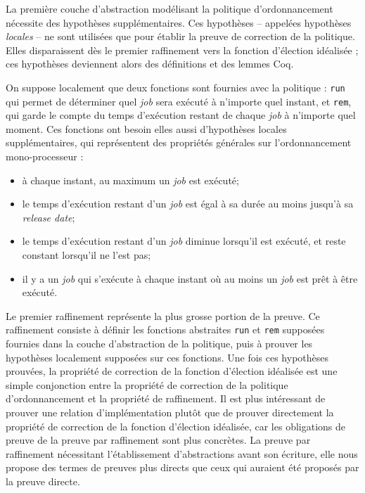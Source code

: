 	La première couche d'abstraction modélisant la politique d'ordonnancement nécessite des hypothèses supplémentaires. Ces hypothèses -- appelées hypothèses \emph{locales} -- ne sont utilisées que pour établir la preuve de correction de la politique. Elles disparaissent dès le premier raffinement vers la fonction d'élection idéalisée ; ces hypothèses deviennent alors des définitions et des lemmes Coq.

	On suppose localement que deux fonctions sont fournies avec la politique : \texttt{run} qui permet de déterminer quel \emph{job} sera exécuté à n'importe quel instant, et \texttt{rem}, qui garde le compte du temps d'exécution restant de chaque \emph{job} à n'importe quel moment.
	Ces fonctions ont besoin elles aussi d'hypothèses locales supplémentaires, qui représentent des propriétés générales sur l'ordonnancement mono-processeur :
	
	\begin{itemize}
		\item à chaque instant, au maximum un \emph{job} est exécuté;
		\item le temps d'exécution restant d'un \emph{job} est égal à sa durée au moins jusqu'à sa \emph{release date};
		\item le temps d'exécution restant d'un \emph{job} diminue lorsqu'il est exécuté, et reste constant lorsqu'il ne l'est pas;
		\item il y a un \emph{job} qui s'exécute à chaque instant où au moins un \emph{job} est prêt à être exécuté.
	\end{itemize}

	\label{sec:proof_insight}

	Le premier raffinement représente la plus grosse portion de la preuve. Ce raffinement consiste à définir les fonctions abstraites \texttt{run} et \texttt{rem} supposées fournies dans la couche d'abstraction de la politique, puis à prouver les hypothèses localement supposées sur ces fonctions.
		Une fois ces hypothèses prouvées, la propriété de correction de la fonction d'élection idéalisée est une simple conjonction entre la propriété de correction de la politique d'ordonnancement et la propriété de raffinement. Il est plus intéressant de prouver une relation d'implémentation plutôt que de prouver directement la propriété de correction de la fonction d'élection idéalisée, car les obligations de preuve de la preuve par raffinement sont plus concrètes. La preuve par raffinement nécessitant l'établissement d'abstractions avant son écriture, elle nous propose des termes de preuves plus directs que ceux qui auraient été proposés par la preuve directe.


